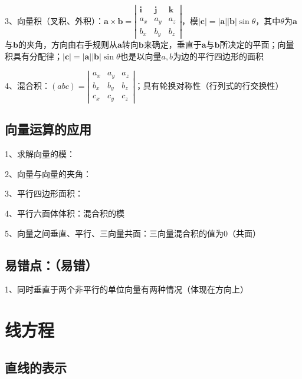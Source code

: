 3、向量积（叉积、外积）：$ \boldsymbol{a} \times \boldsymbol{b}=\left|\begin{array}{ccc}\boldsymbol{i} & \boldsymbol{j} & \boldsymbol{k} \\a_{x} & a_{y} & a_{z} \\b_{x} & b_{y} & b_{z}\end{array}\right| $，模$ |\boldsymbol{c}|=|\boldsymbol{a}||\boldsymbol{b}| \sin \theta $，其中$ \theta $为$ \boldsymbol{a} $与$ \boldsymbol{b} $的夹角，方向由右手规则从$ \boldsymbol{a} $转向$ \boldsymbol{b} $来确定，垂直于$ \boldsymbol{a} $与$ \boldsymbol{b} $所决定的平面；向量积具有分配律；$ |\boldsymbol{c}|=|\boldsymbol{a}||\boldsymbol{b}| \sin \theta $也是以向量$ a,b $为边的平行四边形的面积

4、混合积：$ (a b c)=\left|\begin{array}{lll}a_{x} & a_{y} & a_{z} \\b_{x} & b_{y} & b_{z} \\c_{x} & c_{y} & c_{z}\end{array}\right| $；具有轮换对称性（行列式的行交换性）



\subsection{向量运算的应用}

1、求解向量的模：

2、向量与向量的夹角：

3、平行四边形面积：

4、平行六面体体积：混合积的模

5、向量之间垂直、平行、三向量共面：三向量混合积的值为0（共面）



\subsection{易错点：（易错）}

1、同时垂直于两个非平行的单位向量有两种情况（体现在方向上）

\section{线方程}



\subsection{直线的表示}

